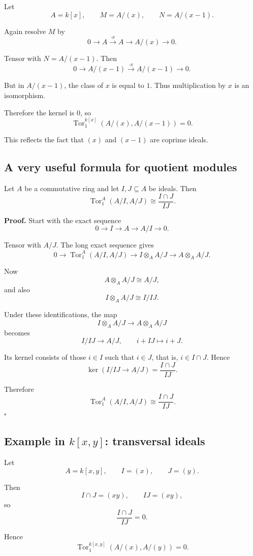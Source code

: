 \documentclass[12pt,a4paper]{article}
\theoremstyle{notespace}
\begin{document}
Let
\[
A=k[x],
\qquad
M=A/(x),
\qquad
N=A/(x-1).
\]

Again resolve \(M\) by
\[
0\to A \xrightarrow{\cdot x} A \to A/(x)\to 0.
\]

Tensor with \(N=A/(x-1)\). Then
\[
0\to A/(x-1)\xrightarrow{\cdot x}A/(x-1)\to 0.
\]

But in \(A/(x-1)\), the class of \(x\) is equal to \(1\). Thus multiplication by \(x\) is an isomorphism.

Therefore the kernel is \(0\), so
\[
\operatorname{Tor}_1^{k[x]}(A/(x),A/(x-1))=0.
\]

This reflects the fact that \((x)\) and \((x-1)\) are coprime ideals.

\subsection{A very useful formula for quotient modules}

Let \(A\) be a commutative ring and let \(I,J\subseteq A\) be ideals. Then
\[
\operatorname{Tor}_1^A(A/I,A/J)\cong \frac{I\cap J}{IJ}.
\]

\medskip

\textbf{Proof.}
Start with the exact sequence
\[
0\to I \to A \to A/I \to 0.
\]

Tensor with \(A/J\). The long exact sequence gives
\[
0\to \operatorname{Tor}_1^A(A/I,A/J)\to I\otimes_A A/J \to A\otimes_A A/J.
\]

Now
\[
A\otimes_A A/J \cong A/J,
\]
and also
\[
I\otimes_A A/J \cong I/IJ.
\]

Under these identifications, the map
\[
I\otimes_A A/J \to A\otimes_A A/J
\]
becomes
\[
I/IJ \longrightarrow A/J,
\qquad
i+IJ \longmapsto i+J.
\]

Its kernel consists of those \(i\in I\) such that \(i\in J\), that is, \(i\in I\cap J\). Hence
\[
\ker(I/IJ\to A/J)=\frac{I\cap J}{IJ}.
\]

Therefore
\[
\operatorname{Tor}_1^A(A/I,A/J)\cong \frac{I\cap J}{IJ}.
\]
\hfill\(\square\)

\subsection{Example in \(k[x,y]\): transversal ideals}

Let
\[
A=k[x,y],
\qquad
I=(x),
\qquad
J=(y).
\]

Then
\[
I\cap J=(xy),
\qquad
IJ=(xy),
\]
so
\[
\frac{I\cap J}{IJ}=0.
\]

Hence
\[
\operatorname{Tor}_1^{k[x,y]}(A/(x),A/(y))=0.
\]
\end{document}

